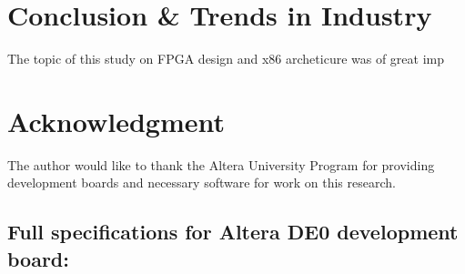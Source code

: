 \documentclass[conference]{IEEEtran}
\begin{document}
\section{Conclusion \& Trends in Industry}
The topic of this study on FPGA design and x86 archeticure was of great imp

\section*{Acknowledgment}
The author would like to thank the Altera University Program \cite{UniProgram} for providing development boards and necessary software for work on this research.

\appendix
\label{App:AppendixA}
\subsection{Full specifications for Altera DE0 development board:}
\end{document}
